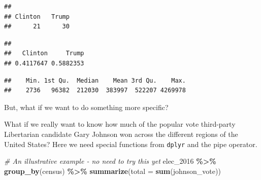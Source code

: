 \documentclass[
]{book}
\newenvironment{Shaded}{\begin{snugshade}}{\end{snugshade}}
\newcommand{\AttributeTok}[1]{\textcolor[rgb]{0.13,0.29,0.53}{#1}}
\newcommand{\CommentTok}[1]{\textcolor[rgb]{0.56,0.35,0.01}{\textit{#1}}}
\newcommand{\FunctionTok}[1]{\textcolor[rgb]{0.13,0.29,0.53}{\textbf{#1}}}
\newcommand{\NormalTok}[1]{#1}
\newcommand{\SpecialCharTok}[1]{\textcolor[rgb]{0.81,0.36,0.00}{\textbf{#1}}}
\begin{document}
\begin{verbatim}
## 
## Clinton   Trump 
##      21      30
\end{verbatim}

\begin{Shaded}
\end{Shaded}

\begin{verbatim}
## 
##   Clinton     Trump 
## 0.4117647 0.5882353
\end{verbatim}

\begin{Shaded}
\end{Shaded}

\begin{verbatim}
##    Min. 1st Qu.  Median    Mean 3rd Qu.    Max. 
##    2736   96382  212030  383997  522207 4269978
\end{verbatim}

But, what if we want to do something more specific?

What if we really want to know how much of the popular vote third-party Libertarian candidate Gary Johnson won across the different regions of the United States? Here we need special functions from \texttt{dplyr} and the pipe operator.

\begin{Shaded}
\begin{Highlighting}[]
\CommentTok{\# An illustrative example {-} no need to try this yet}
\NormalTok{elec\_2016 }\SpecialCharTok{\%\textgreater{}\%}
  \FunctionTok{group\_by}\NormalTok{(census) }\SpecialCharTok{\%\textgreater{}\%}
  \FunctionTok{summarize}\NormalTok{(}\AttributeTok{total =} \FunctionTok{sum}\NormalTok{(johnson\_vote))}
\end{Highlighting}
\end{Shaded}
\end{document}
